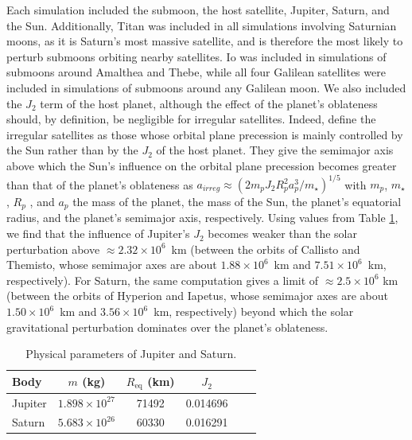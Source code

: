 \documentclass{aa}
\begin{document}
Each simulation included the submoon, the host satellite, Jupiter, Saturn, and the Sun. Additionally, Titan was included in all simulations involving Saturnian moons, as it is Saturn's most massive satellite, and is therefore the most likely to perturb submoons orbiting nearby satellites. Io was included in simulations of submoons around Amalthea and Thebe, while all four Galilean satellites were included in simulations of submoons around any Galilean moon. We also included the $J_2$ term of the host planet, although the effect of the planet's oblateness should, by definition, be negligible for irregular satellites. Indeed, \cite{Nesvorný_2003} define the irregular satellites as those whose orbital plane precession is mainly controlled by the Sun rather than by the $J_2$ of the host planet. They give the semimajor axis above which the Sun's influence on the orbital plane precession becomes greater than that of the planet's oblateness as $a_{irreg} \approx\left(2m_p J_2 R_p^2 a_p^3/m_\star\right)^{1/5}$ with $m_p$, $m_\star$, $R_p$ , and $a_p$ the mass of the planet, the mass of the Sun, the planet's equatorial radius, and the planet's semimajor axis, respectively.
Using values from Table \ref{tab:airreg_constants}, we find that the influence of Jupiter's $J_2$ becomes weaker than the solar perturbation above $\approx 2.32\times10^6$~km (between the orbits of Callisto and Themisto, whose semimajor axes are about $1.88\times10^6$~km and $7.51\times10^6$~km, respectively). For Saturn, the same computation gives a limit of $\approx2.5\times10^6$ km (between the orbits of Hyperion and Iapetus, whose semimajor axes are about $1.50\times10^6$~km and $3.56\times10^6$~km, respectively) beyond which the solar gravitational perturbation dominates over the planet's oblateness. 

\begin{table}[t]
\caption{Physical parameters of Jupiter and Saturn. }
\label{tab:airreg_constants}
\centering
\begin{tabular}{lccccc}
\hline\hline
Body & $m$ (kg) & $R_{\mathrm{eq}}$ (km) & $J_2$  \\
\hline
Jupiter & $1.898\times10^{27}$   & 71492 &  0.014696  \\
Saturn  & $5.683\times10^{26}$   & 60330 &  0.016291  \\
\hline
\end{tabular}
\\[1mm]
\raggedright
\end{table}
\end{document}
